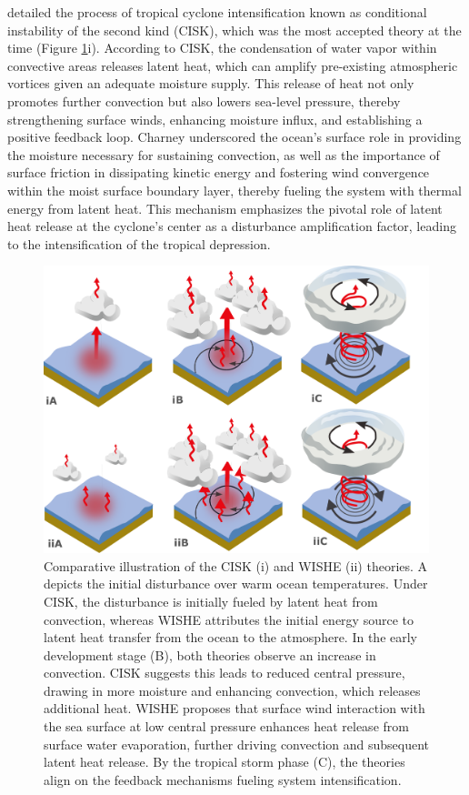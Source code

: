 \citet{charney1964growth} detailed the process of tropical cyclone intensification known as conditional instability of the second kind (CISK), which was the most accepted theory at the time (Figure \ref{cisk_wishe}i). According to CISK, the condensation of water vapor within convective areas releases latent heat, which can amplify pre-existing atmospheric vortices given an adequate moisture supply. This release of heat not only promotes further convection but also lowers sea-level pressure, thereby strengthening surface winds, enhancing moisture influx, and establishing a positive feedback loop. Charney underscored the ocean's surface role in providing the moisture necessary for sustaining convection, as well as the importance of surface friction in dissipating kinetic energy and fostering wind convergence within the moist surface boundary layer, thereby fueling the system with thermal energy from latent heat. This mechanism emphasizes the pivotal role of latent heat release at the cyclone's center as a disturbance amplification factor, leading to the intensification of the tropical depression.

\begin{figure}[h!]
\begin{center}
\setcaptionmargin{1cm}
\includegraphics[width=0.9\columnwidth,angle=0]{fig/CISK_WISHE.pdf}
\caption[Comparison - CISK vs. WISHE]{Comparative illustration of the CISK (i) and WISHE (ii) theories. A depicts the initial disturbance over warm ocean temperatures. Under CISK, the disturbance is initially fueled by latent heat from convection, whereas WISHE attributes the initial energy source to latent heat transfer from the ocean to the atmosphere. In the early development stage (B), both theories observe an increase in convection. CISK suggests this leads to reduced central pressure, drawing in more moisture and enhancing convection, which releases additional heat. WISHE proposes that surface wind interaction with the sea surface at low central pressure enhances heat release from surface water evaporation, further driving convection and subsequent latent heat release. By the tropical storm phase (C), the theories align on the feedback mechanisms fueling system intensification.}
\label{cisk_wishe}
\end{center}
\end{figure}

